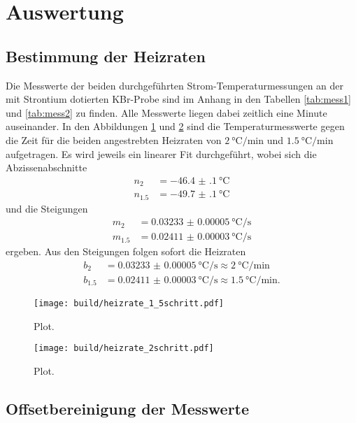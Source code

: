 \section{Auswertung}
\label{sec:Auswertung}

\subsection{Bestimmung der Heizraten}

Die Messwerte der beiden durchgeführten Strom-Temperaturmessungen an der mit
Strontium dotierten KBr-Probe sind im Anhang in den Tabellen \ref{tab:mess1}
und \ref{tab:mess2} zu finden. Alle Messwerte liegen dabei zeitlich eine Minute
auseinander. In den Abbildungen \ref{fig:heizrate2} und \ref{fig:heizrate15} sind
die Temperaturmesswerte gegen die Zeit für die beiden angestrebten Heizraten
von $\SI{2}{\celsius\per\minute}$ und $\SI{1.5}{\celsius\per\minute}$ aufgetragen.
Es wird jeweils ein linearer Fit durchgeführt, wobei sich die Abzissenabschnitte
\begin{align}
  n_{2} &= \SI{-46.4(1)}{\celsius}\\
  n_{1.5} &= \SI{-49.7(1)}{\celsius}
\end{align}
und die Steigungen
\begin{align}
  m_{2} &= \SI{0.03233(5)}{\celsius\per\second}\\
  m_{1.5} &= \SI{0.02411(3)}{\celsius\per\second}
\end{align}
ergeben. Aus den Steigungen folgen sofort die Heizraten
\begin{align}
  b_{2} &= \SI{0.03233(5)}{\celsius\per\second} \approx \SI{2}{\celsius\per\minute} \\
  b_{1.5} &= \SI{0.02411(3)}{\celsius\per\second} \approx \SI{1.5}{\celsius\per\minute}.
  \label{eqn:heizrate}
\end{align}

\begin{figure}
  \centering
  \texttt{[image: build/heizrate\_1\_5schritt.pdf]}
  \caption{Plot.}
  \label{fig:heizrate2}
\end{figure}

\begin{figure}
  \centering
  \texttt{[image: build/heizrate\_2schritt.pdf]}
  \caption{Plot.}
  \label{fig:heizrate15}
\end{figure}

\subsection{Offsetbereinigung der Messwerte}

